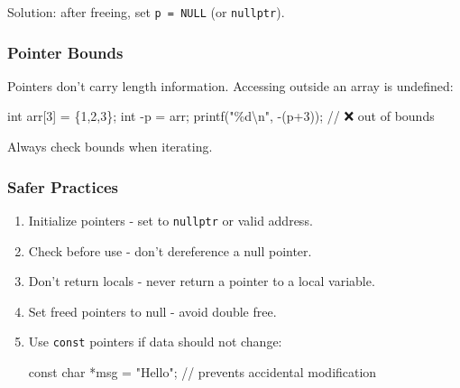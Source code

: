 \documentclass[
  letterpaper,
  DIV=11,
  numbers=noendperiod]{scrreprt}
\newenvironment{Shaded}{\begin{snugshade}}{\end{snugshade}}
\newcommand{\CommentTok}[1]{\textcolor[rgb]{0.37,0.37,0.37}{#1}}
\newcommand{\DataTypeTok}[1]{\textcolor[rgb]{0.68,0.00,0.00}{#1}}
\newcommand{\DecValTok}[1]{\textcolor[rgb]{0.68,0.00,0.00}{#1}}
\newcommand{\NormalTok}[1]{\textcolor[rgb]{0.00,0.23,0.31}{#1}}
\newcommand{\OperatorTok}[1]{\textcolor[rgb]{0.37,0.37,0.37}{#1}}
\newcommand{\SpecialCharTok}[1]{\textcolor[rgb]{0.37,0.37,0.37}{#1}}
\newcommand{\StringTok}[1]{\textcolor[rgb]{0.13,0.47,0.30}{#1}}
\begin{document}
Solution: after freeing, set \texttt{p\ =\ NULL} (or \texttt{nullptr}).

\subsubsection{Pointer Bounds}\label{pointer-bounds}

Pointers don't carry length information. Accessing outside an array is
undefined:

\begin{Shaded}
\begin{Highlighting}[]
\DataTypeTok{int}\NormalTok{ arr}\OperatorTok{[}\DecValTok{3}\OperatorTok{]} \OperatorTok{=} \OperatorTok{\{}\DecValTok{1}\OperatorTok{,}\DecValTok{2}\OperatorTok{,}\DecValTok{3}\OperatorTok{\};}
\DataTypeTok{int} \OperatorTok{{-}}\NormalTok{p }\OperatorTok{=}\NormalTok{ arr}\OperatorTok{;}
\NormalTok{printf}\OperatorTok{(}\StringTok{"}\SpecialCharTok{\%d\textbackslash{}n}\StringTok{"}\OperatorTok{,} \OperatorTok{{-}(}\NormalTok{p}\OperatorTok{+}\DecValTok{3}\OperatorTok{));} \CommentTok{// ❌ out of bounds}
\end{Highlighting}
\end{Shaded}

Always check bounds when iterating.

\subsubsection{Safer Practices}\label{safer-practices}

\begin{enumerate}
\def\labelenumi{\arabic{enumi}.}
\item
  Initialize pointers - set to \texttt{nullptr} or valid address.
\item
  Check before use - don't dereference a null pointer.
\item
  Don't return locals - never return a pointer to a local variable.
\item
  Set freed pointers to null - avoid double free.
\item
  Use \texttt{const} pointers if data should not change:

\begin{Shaded}
\begin{Highlighting}[]
\DataTypeTok{const} \DataTypeTok{char} \OperatorTok{*}\NormalTok{msg }\OperatorTok{=} \StringTok{"Hello"}\OperatorTok{;} \CommentTok{// prevents accidental modification}
\end{Highlighting}
\end{Shaded}
\end{enumerate}
\end{document}
